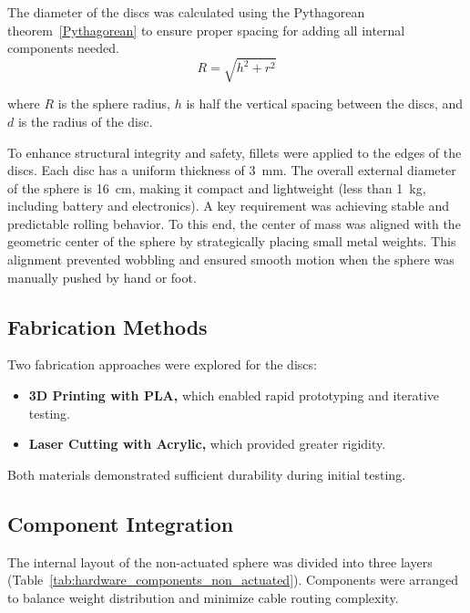 \documentclass[english, bachelor, utf8]{base/thesis_telematics}
\begin{document}
The diameter of the discs was calculated using the Pythagorean theorem~\ref{Pythagorean} to ensure proper spacing for adding all internal components needed.
\begin{equation}
    R = \sqrt{h^2 + r^2} \label{Pythagorean}
\end{equation}


\noindent
where $R$ is the sphere radius, $h$ is half the vertical spacing between the discs, and $d$ is the radius of the disc.

To enhance structural integrity and safety, fillets were applied to the edges of the discs. 
Each disc has a uniform thickness of \SI{3}{\milli\meter}.
The overall external diameter of the sphere is \SI{16}{\centi\meter}, making it compact and lightweight (less than \SI{1}{\kilo\gram}, including battery and electronics).
A key requirement was achieving stable and predictable rolling behavior. 
To this end, the center of mass was aligned with the geometric center of the sphere by strategically placing small metal weights. 
This alignment prevented wobbling and ensured smooth motion when the sphere was manually pushed by hand or foot.

\subsection{Fabrication Methods}
Two fabrication approaches were explored for the discs:
\begin{itemize}
    \item \textbf{3D Printing with PLA,} which enabled rapid prototyping and iterative testing.
    \item \textbf{Laser Cutting with Acrylic,} which provided greater rigidity.
\end{itemize}
Both materials demonstrated sufficient durability during initial testing.

\subsection{Component Integration}
The internal layout of the non-actuated sphere was divided into three layers (Table~\ref{tab:hardware_components_non_actuated}).
Components were arranged to balance weight distribution and minimize cable routing complexity.
\end{document}

